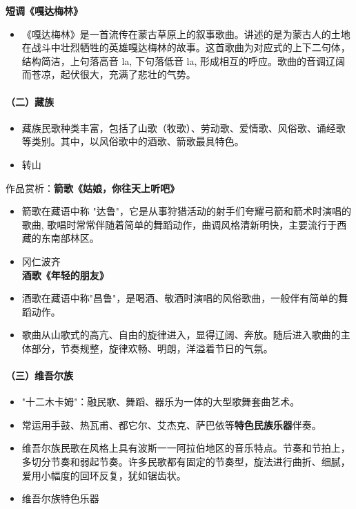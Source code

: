 \documentclass[
]{article}
\providecommand{\tightlist}{%
  \setlength{\itemsep}{0pt}\setlength{\parskip}{0pt}}
\begin{document}
\textbf{短调《嘎达梅林》}

\begin{itemize}
\tightlist
\item
  《嘎达梅林》是一首流传在蒙古草原上的叙事歌曲。讲述的是为蒙古人的土地在战斗中壮烈牺牲的英雄嘎达梅林的故事。这首歌曲为对应式的上下二句体，结构简洁，上句落高音
  la, 下句落低音 la,
  形成相互的呼应。歌曲的音调辽阔而苍凉，起伏很大，充满了悲壮的气势。
\end{itemize}

\paragraph{（二）藏族}\label{ux4e8cux85cfux65cf}

\begin{itemize}
\tightlist
\item
  藏族民歌种类丰富，包括了山歌（牧歌）、劳动歌、爱情歌、风俗歌、诵经歌等类别。其中，以风俗歌中的酒歌、箭歌最具特色。
\item
  转山
\end{itemize}

作品赏析：\textbf{箭歌《姑娘，你往天上听吧》}

\begin{itemize}
\tightlist
\item
  箭歌在藏语中称
  "达鲁"，它是从事狩猎活动的射手们夸耀弓箭和箭术时演唱的歌曲,
  歌唱时常常伴随着简单的舞蹈动作，曲调风格清新明快，主要流行于西藏的东南部林区。
\item
  冈仁波齐\\
  \textbf{酒歌《年轻的朋友》}
\item
  酒歌在藏语中称"昌鲁"，是喝酒、敬酒时演唱的风俗歌曲，一般伴有简单的舞蹈动作。
\item
  歌曲从山歌式的高亢、自由的旋律进入，显得辽阔、奔放。随后进入歌曲的主体部分，节奏规整，旋律欢畅、明朗，洋溢着节日的气氛。
\end{itemize}

\paragraph{（三）维吾尔族}\label{ux4e09ux7ef4ux543eux5c14ux65cf}

\begin{itemize}
\tightlist
\item
  "十二木卡姆"：融民歌、舞蹈、器乐为一体的大型歌舞套曲艺术。
\item
  常运用手鼓、热瓦甫、都它尔、艾杰克、萨巴依等\textbf{特色民族乐器}伴奏。
\item
  维吾尔族民歌在风格上具有波斯一一阿拉伯地区的音乐特点。节奏和节拍上，多切分节奏和弱起节奏。许多民歌都有固定的节奏型，旋法进行曲折、细腻，爱用小幅度的回环反复，犹如锯齿状。
\item
  维吾尔族特色乐器
\end{itemize}
\end{document}
